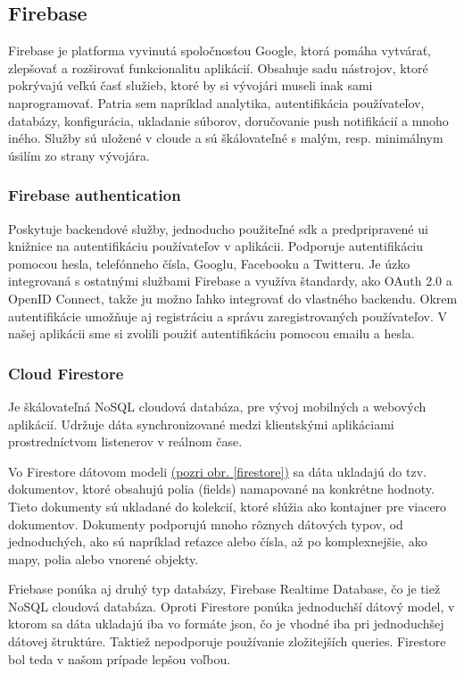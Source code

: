 \subsection{Firebase}
Firebase je platforma vyvinutá spoločnosťou Google, ktorá pomáha vytvárať, zlepšovať a rozširovať funkcionalitu aplikácií. Obsahuje sadu nástrojov, ktoré pokrývajú veľkú časť služieb, ktoré by si vývojári museli inak sami naprogramovať. Patria sem napríklad analytika, autentifikácia používateľov, databázy, konfigurácia, ukladanie súborov, doručovanie push notifikácií a mnoho iného. Služby sú uložené v cloude a sú škálovateľné s malým, resp. minimálnym úsilím zo strany vývojára. \cite{firebase} \\

\subsubsection{Firebase authentication}
\label{sec:firebaseauth}
Poskytuje backendové služby, jednoducho použiteľné \acrshort{sdk} a predpripravené \acrshort{ui} knižnice na autentifikáciu používateľov v aplikácii. Podporuje autentifikáciu pomocou hesla, telefónneho čísla, Googlu, Facebooku a Twitteru. Je úzko integrovaná s ostatnými službami Firebase a využíva  štandardy, ako OAuth 2.0 a OpenID Connect, takže ju možno ľahko integrovať do vlastného backendu. \cite{auth} Okrem autentifikácie umožňuje aj registráciu a správu zaregistrovaných používateľov. V našej aplikácii sme si zvolili použiť autentifikáciu pomocou emailu a hesla. \\

\subsubsection{Cloud Firestore}
\label{sec:firestore}
Je škálovateľná NoSQL cloudová databáza, pre vývoj mobilných a webových aplikácií. Udržuje dáta synchronizované medzi klientskými aplikáciami prostredníctvom listenerov v reálnom čase.

Vo Firestore dátovom modeli \hyperref[firestore]{(pozri obr. \ref{firestore})} sa dáta ukladajú do tzv. dokumentov, ktoré obsahujú polia (fields) namapované na konkrétne hodnoty. Tieto dokumenty sú ukladané do kolekcií, ktoré slúžia ako kontajner pre viacero dokumentov. Dokumenty podporujú mnoho rôznych dátových typov, od jednoduchých, ako sú napríklad reťazce alebo čísla, až po komplexnejšie, ako mapy, polia alebo vnorené objekty. \cite{firestoredoc}

Friebase ponúka aj druhý typ databázy, Firebase Realtime Database, čo je tiež NoSQL cloudová databáza. Oproti Firestore ponúka jednoduchší dátový model, v ktorom sa dáta ukladajú iba vo formáte \acrshort{json}, čo je vhodné iba pri jednoduchšej dátovej štruktúre. Taktiež nepodporuje používanie zložitejších queries. Firestore bol teda v našom prípade lepšou voľbou. \\

